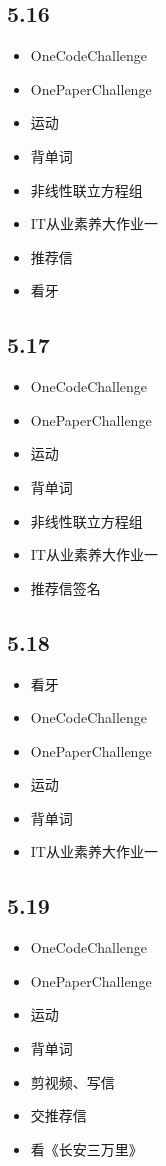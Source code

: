 \documentclass[UTF8]{ctexart}
\begin{document}
\subsection*{5.16}
\begin{itemize}
    \item OneCodeChallenge
    \item OnePaperChallenge
    \item 运动
    \item 背单词
    \item 非线性联立方程组
    \item IT从业素养大作业一
    \item 推荐信
    \item 看牙
\end{itemize}

\subsection*{5.17}
\begin{itemize}
    \item OneCodeChallenge
    \item OnePaperChallenge
    \item 运动
    \item 背单词
    \item 非线性联立方程组
    \item IT从业素养大作业一
    \item 推荐信签名
\end{itemize}

\subsection*{5.18}
\begin{itemize}
    \item 看牙
    \item OneCodeChallenge
    \item OnePaperChallenge
    \item 运动
    \item 背单词
    \item IT从业素养大作业一
\end{itemize}

\subsection*{5.19}
\begin{itemize}
    \item OneCodeChallenge
    \item OnePaperChallenge
    \item 运动
    \item 背单词
    \item 剪视频、写信
    \item 交推荐信
    \item 看《长安三万里》
\end{itemize}
\end{document}
